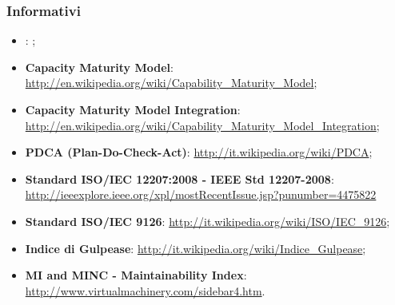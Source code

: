 \subsubsection{Informativi}
\label{informativi}
\begin{itemize}
\item \textbf{\PP}: \pianoDiProgetto;
\item \textbf{Capacity Maturity Model}: \url{http://en.wikipedia.org/wiki/Capability_Maturity_Model};
\item \textbf{Capacity Maturity Model Integration}: \url{http://en.wikipedia.org/wiki/Capability_Maturity_Model_Integration};
\item \textbf{PDCA (Plan-Do-Check-Act)}: \url{http://it.wikipedia.org/wiki/PDCA};
\item \textbf{Standard ISO/IEC 12207:2008 - IEEE Std 12207-2008}:
\url{http://ieeexplore.ieee.org/xpl/mostRecentIssue.jsp?punumber=4475822}
\item \textbf{Standard ISO/IEC 9126}: \url{http://it.wikipedia.org/wiki/ISO/IEC_9126};
\item \textbf{Indice di Gulpease}: \url{http://it.wikipedia.org/wiki/Indice_Gulpease};
\item \textbf{MI and MINC - Maintainability Index}: \url{http://www.virtualmachinery.com/sidebar4.htm}.
\end{itemize}
